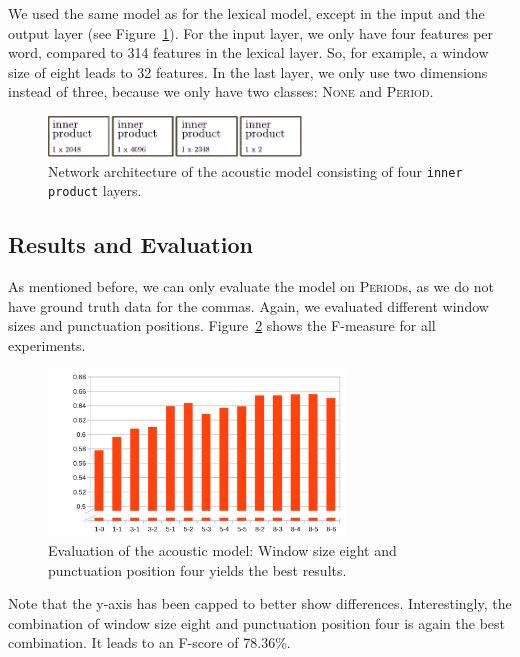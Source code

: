 We used the same model as for the lexical model, except in the input and the output layer (see Figure~\ref{fig:net_acoustic}).
For the input layer, we only have four features per word, compared to 314 features in the lexical layer.
So, for example, a window size of eight leads to 32 features.
In the last layer, we only use two dimensions instead of three, because we only have two classes: \textsc{None} and \textsc{Period}.

\begin{figure}[ht]
    \centering
    \includegraphics[width=0.6\textwidth]{img/net_acoustic.pdf}
    \caption{Network architecture of the acoustic model consisting of four \texttt{inner product} layers.}
    \label{fig:net_acoustic}
\end{figure}


\subsection{Results and Evaluation}

As mentioned before, we can only evaluate the model on \textsc{Period}s, as we do not have ground truth data for the commas.
Again, we evaluated different window sizes and punctuation positions.
Figure~\ref{audio_eval} shows the F-measure for all experiments.
\begin{figure}[ht]
    \centering
    \includegraphics[width=0.7\textwidth]{img/audio_parameter_eval.png}
    \caption{Evaluation of the acoustic model: Window size eight and punctuation position four yields the best results.}
    \label{audio_eval}
\end{figure}
Note that the y-axis has been capped to better show differences.
Interestingly, the combination of window size eight and punctuation position four is again the best combination.
It leads to an F-score of 78.36\%.



